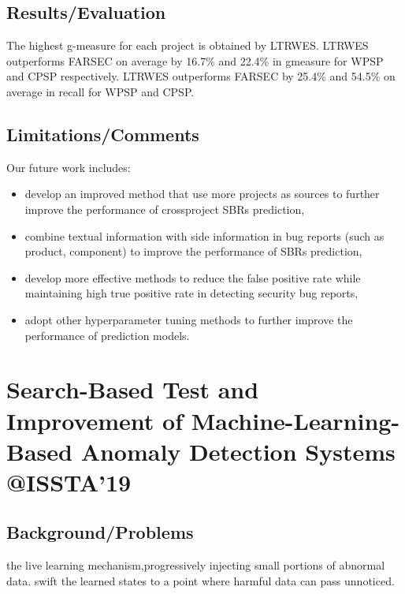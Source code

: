 \subsection{Results/Evaluation}
The highest g-measure for each project is obtained by LTRWES. LTRWES outperforms FARSEC on average by 16.7\% and 22.4\% in gmeasure for WPSP and CPSP respectively. 
LTRWES outperforms FARSEC by 25.4\% and 54.5\% on average in recall for WPSP and CPSP.
\subsection{Limitations/Comments}
Our future work includes: 
\begin{itemize}
\item  develop an improved method that use more projects as sources to further improve the performance of crossproject SBRs prediction, 
\item  combine textual information with side information in bug reports (such as product, component) to improve the performance of SBRs prediction, 
\item  develop more effective methods to reduce the false positive rate while maintaining high true positive rate in detecting security bug reports, 
\item  adopt other hyperparameter tuning methods to further improve the performance of prediction models.
\end{itemize}
\newpage

\section{Search-Based Test and Improvement of Machine-Learning-Based Anomaly Detection Systems @ISSTA'19}
\subsection{Background/Problems}
the live learning mechanism,progressively injecting small portions of abnormal data. swift the learned states to a point where harmful data can pass unnoticed.
